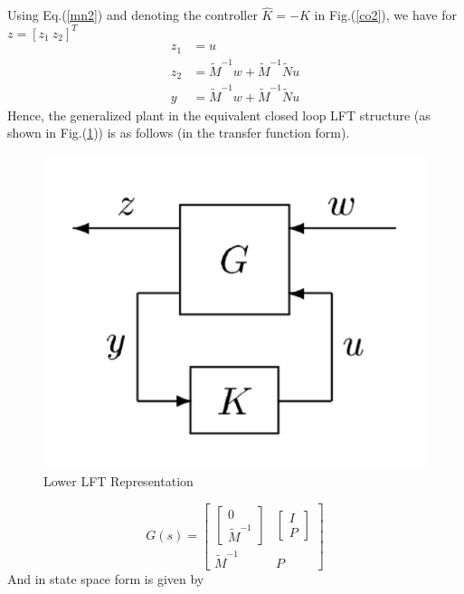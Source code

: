 \documentclass[a4paper,12pt]{article}
\begin{document}
	Using Eq.(\ref{mn2}) and denoting the controller $\hat{K}=-K$ in Fig.(\ref{co2}), we have for $z=[z_{1}\: z_{2}]^{T}$
	\begin{align*}
	z_{1} &= u \\
	z_{2} &= \tilde{M}^{-1}w + \tilde{M}^{-1}\tilde{N}u\\
	y &= \tilde{M}^{-1}w + \tilde{M}^{-1}\tilde{N}u
	\end{align*}
	Hence, the generalized plant in the equivalent closed loop LFT structure (as shown in Fig.(\ref{lft})) is as follows (in the transfer function form).
	\begin{figure}[H]
			  \centering
			  \includegraphics[scale=0.3]{lft}
%			  
			  \caption{Lower LFT Representation}
			 \label{lft}
		\end{figure}
	\begin{equation}
	G(s) = \begin{bmatrix}
	\begin{bmatrix}
	0\\\tilde{M}^{-1}
	\end{bmatrix} & \begin{bmatrix}
	I \\ P
	\end{bmatrix} \\
	\tilde{M}^{-1} & P
	\end{bmatrix}
	\end{equation}
	And in state space form is given by
\end{document}
